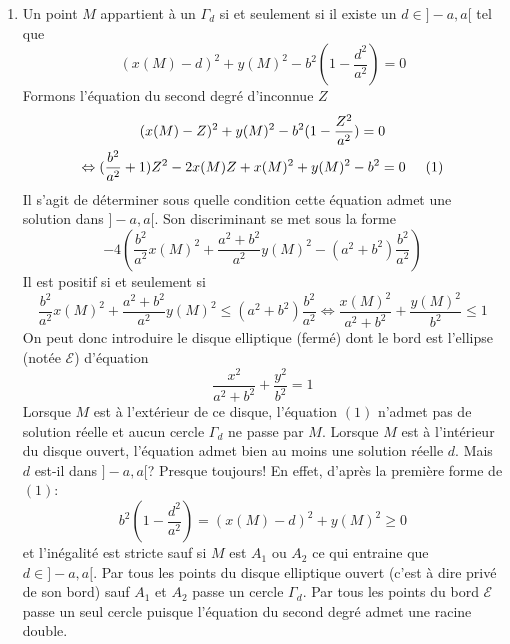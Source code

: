\begin{enumerate}
\begin{enumerate}
 \item Un point $M$ appartient à un $\Gamma_d$ si et seulement si il existe un $d\in ]-a,a[$ tel que
\begin{displaymath}
(x(M)-d)^2+ y(M)^2-b^2(1-\frac{d^2}{a^2})=0
\end{displaymath}
Formons l'équation du second degré d'inconnue $Z$
\begin{multline*}
(x(M)-Z)^2+ y(M)^2-b^2(1-\frac{Z^2}{a^2})=0 \\
\Leftrightarrow
(\frac{b^2}{a^2}+1)Z^2 -2x(M)Z+x(M)^2+y(M)^2-b^2=0 \hspace{0.5cm} (1)
\end{multline*}
Il s'agit de déterminer sous quelle condition cette équation admet une solution dans $]-a,a[$.
Son discriminant se met sous la forme
\begin{displaymath}
 -4\left(
\frac{b^2}{a^2}x(M)^2 + \frac{a^2+b^2}{a^2}y(M)^2 - (a^2+b^2)\frac{b^2}{a^2}
 \right) 
\end{displaymath}
Il est positif si et seulement si
\begin{displaymath}
 \frac{b^2}{a^2}x(M)^2 + \frac{a^2+b^2}{a^2}y(M)^2 \leq (a^2+b^2)\frac{b^2}{a^2}
\Leftrightarrow
\frac{x(M)^2}{a^2+b^2} + \frac{y(M)^2}{b^2}\leq 1
\end{displaymath}
On peut donc introduire le disque elliptique (fermé) dont le bord est l'ellipse (notée $\mathcal E$) d'équation
\begin{displaymath}
 \frac{x^2}{a^2+b^2} + \frac{y^2}{b^2} = 1
\end{displaymath}
Lorsque $M$ est à l'extérieur de ce disque, l'équation $(1)$ n'admet pas de solution réelle et aucun cercle $\Gamma_d$ ne passe par $M$.\newline
Lorsque $M$ est à l'intérieur du disque ouvert, l'équation admet bien au moins une solution réelle $d$. Mais $d$ est-il dans $]-a,a[$?\newline
Presque toujours! En effet, d'après la première forme de $(1)$:
\begin{displaymath}
 b^2(1-\frac{d^2}{a^2})=(x(M)-d)^2+y(M)^2\geq 0
\end{displaymath}
et l'inégalité est stricte sauf si $M$ est $A_1$ ou $A_2$ ce qui entraine que $d\in]-a,a[$. Par tous les points du disque elliptique ouvert (c'est à dire privé de son bord) sauf $A_1$ et $A_2$ passe un cercle $\Gamma_d$. Par tous les points du bord $\mathcal{ E}$ passe un seul cercle puisque l'équation du second degré admet une racine double. 
\end{enumerate}


\end{enumerate}
